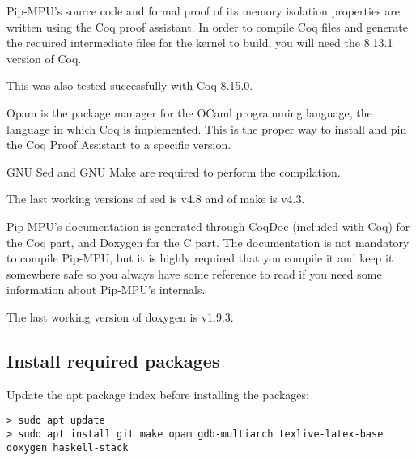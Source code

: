 \documentclass[10pt,a4paper,titlepage]{refart}
\begin{document}
Pip-MPU's source code and formal proof of its memory isolation properties are written
using the Coq proof assistant. In order to compile Coq files and
generate the required intermediate files for the kernel to build, you will need the 8.13.1 version of Coq.

This was also tested successfully with Coq 8.15.0.

 
Opam is the package manager for the OCaml programming language, the language in
which Coq is implemented. This is the proper way to install and pin the Coq
Proof Assistant to a specific version.

GNU Sed and GNU Make are required to perform the compilation.

The last working versions of sed is v4.8 and of make is v4.3.

Pip-MPU's documentation is generated through CoqDoc (included with Coq) for the Coq part, and Doxygen for the C part.
The documentation is not mandatory to compile Pip-MPU, but it is highly required that you compile it and keep it somewhere safe so you always have some reference to read if you need some information about Pip-MPU's internals.

The last working version of doxygen is v1.9.3.

\subsection{Install required packages}

Update the apt package index before installing the packages:

\begin{lstlisting}[style=BashStyle]
> sudo apt update
> sudo apt install git make opam gdb-multiarch texlive-latex-base doxygen haskell-stack
\end{lstlisting}
\end{document}
